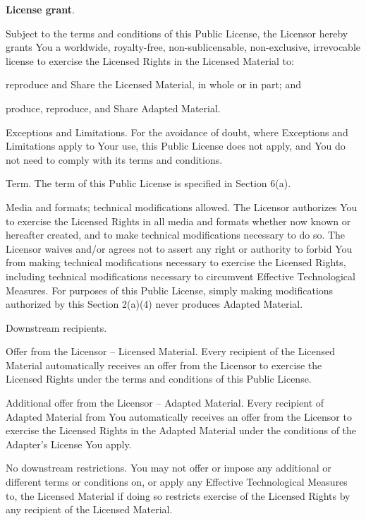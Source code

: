 \begin{doclicense@enumerate}
\item \textbf{License grant}.
\begin{doclicense@enumerate}
\item Subject to the terms and conditions of this Public License, the Licensor hereby grants You a worldwide, royalty-free, non-sublicensable, non-exclusive, irrevocable license to exercise the Licensed Rights in the Licensed Material to:
\begin{doclicense@enumerate}
\item reproduce and Share the Licensed Material, in whole or in part; and
\item produce, reproduce, and Share Adapted Material.
\end{doclicense@enumerate}
\item Exceptions and Limitations. For the avoidance of doubt, where Exceptions and Limitations apply to Your use, this Public License does not apply, and You do not need to comply with its terms and conditions.
\item Term. The term of this Public License is specified in Section 6(a).
\item Media and formats; technical modifications allowed. The Licensor authorizes You to exercise the Licensed Rights in all media and formats whether now known or hereafter created, and to make technical modifications necessary to do so. The Licensor waives and/or agrees not to assert any right or authority to forbid You from making technical modifications necessary to exercise the Licensed Rights, including technical modifications necessary to circumvent Effective Technological Measures. For purposes of this Public License, simply making modifications authorized by this Section 2(a)(4) never produces Adapted Material.
\item Downstream recipients.

\begin{doclicense@enumerate}
\item Offer from the Licensor – Licensed Material. Every recipient of the Licensed Material automatically receives an offer from the Licensor to exercise the Licensed Rights under the terms and conditions of this Public License.
\item Additional offer from the Licensor – Adapted Material. Every recipient of Adapted Material from You automatically receives an offer from the Licensor to exercise the Licensed Rights in the Adapted Material under the conditions of the Adapter’s License You apply.
\item No downstream restrictions. You may not offer or impose any additional or different terms or conditions on, or apply any Effective Technological Measures to, the Licensed Material if doing so restricts exercise of the Licensed Rights by any recipient of the Licensed Material.
\end{doclicense@enumerate}


\end{doclicense@enumerate}
\end{doclicense@enumerate}
